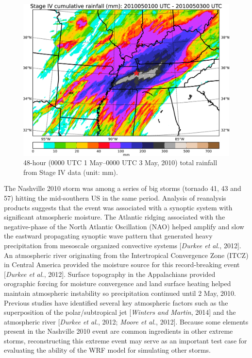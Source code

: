 \begin{figure}[htbp]
	\centering
  	\includegraphics[width=13cm]{pics/ch2/fig1.jpg}
  	\caption{48-hour (0000 UTC 1 May–0000 UTC 3 May, 2010) total rainfall from Stage IV data (unit: mm).}
  	\label{fig:2-1}
\end{figure}

The Nashville 2010 storm was among a series of big storms (tornado 41, 43 and 57) hitting the mid-southern US in the same period. Analysis of reanalysis products suggests that the event was associated with a synoptic system with significant atmospheric moisture. The Atlantic ridging associated with the negative-phase of the North Atlantic Oscillation (NAO) helped amplify and slow the eastward propagating synoptic wave pattern that generated heavy precipitation from mesoscale organized convective systems [\textit{Durkee et al.}, 2012]. An atmospheric river originating from the Intertropical Convergence Zone (ITCZ) in Central America provided the moisture source for this record-breaking event [\textit{Durkee et al.}, 2012]. Surface topography in the Appalachians provided orographic forcing for moisture convergence and land surface heating helped maintain atmospheric instability so precipitation continued until 2 May, 2010. Previous studies have identified several key atmospheric factors such as the superposition of the polar/subtropical jet [\textit{Winters and Martin}, 2014] and the atmospheric river [\textit{Durkee et al.}, 2012; \textit{Moore et al.}, 2012]. Because some elements present in the Nashville 2010 event are common ingredients in other extreme storms, reconstructing this extreme event may serve as an important test case for evaluating the ability of the WRF model for simulating other storms.

